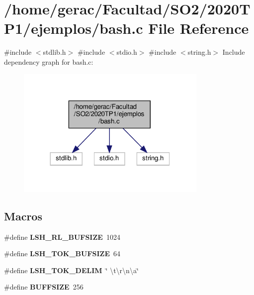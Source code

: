 \section{/home/gerac/\+Facultad/\+S\+O2/2020\+T\+P1/ejemplos/bash.c File Reference}
\label{bash_8c}
{\ttfamily \#include $<$stdlib.\+h$>$}\newline
{\ttfamily \#include $<$stdio.\+h$>$}\newline
{\ttfamily \#include $<$string.\+h$>$}\newline
Include dependency graph for bash.\+c\+:\nopagebreak
\begin{figure}[H]
\begin{center}
\leavevmode
\includegraphics[width=260pt]{bash_8c__incl}
\end{center}
\end{figure}
\subsection*{Macros}
\begin{DoxyCompactItemize}
\item 
\#define \textbf{ L\+S\+H\+\_\+\+R\+L\+\_\+\+B\+U\+F\+S\+I\+ZE}~1024
\item 
\#define \textbf{ L\+S\+H\+\_\+\+T\+O\+K\+\_\+\+B\+U\+F\+S\+I\+ZE}~64
\item 
\#define \textbf{ L\+S\+H\+\_\+\+T\+O\+K\+\_\+\+D\+E\+L\+IM}~\char`\"{} \textbackslash{}t\textbackslash{}r\textbackslash{}n\textbackslash{}a\char`\"{}
\item 
\#define \textbf{ B\+U\+F\+F\+S\+I\+ZE}~256
\end{DoxyCompactItemize}
